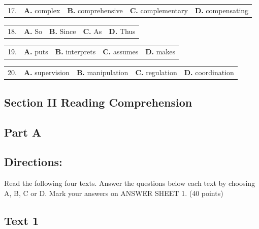 \documentclass[UTF8,11pt]{ctexart}
\begin{document}
\noindent\begin{tabularx}{\linewidth}{@{}lXXXX@{}}17. & \textbf{A.} complex & \textbf{B.} comprehensive & \textbf{C.} complementary & \textbf{D.} compensating\\\end{tabularx}\par

\noindent\begin{tabularx}{\linewidth}{@{}lXXXX@{}}18. & \textbf{A.} So & \textbf{B.} Since & \textbf{C.} As & \textbf{D.} Thus\\\end{tabularx}\par

\noindent\begin{tabularx}{\linewidth}{@{}lXXXX@{}}19. & \textbf{A.} puts & \textbf{B.} interprets & \textbf{C.} assumes & \textbf{D.} makes\\\end{tabularx}\par

\noindent\begin{tabularx}{\linewidth}{@{}lXXXX@{}}20. & \textbf{A.} supervision & \textbf{B.} manipulation & \textbf{C.} regulation & \textbf{D.} coordination\\\end{tabularx}\par

\subsection*{\textbf{Section II Reading Comprehension}}


\subsection*{\textbf{Part A}}


\subsection*{\textbf{Directions:}}


Read the following four texts. Answer the questions below each text by choosing A, B, C or D. Mark your answers on ANSWER SHEET 1. (40 points)


\subsection*{\textbf{Text 1}}
\end{document}
